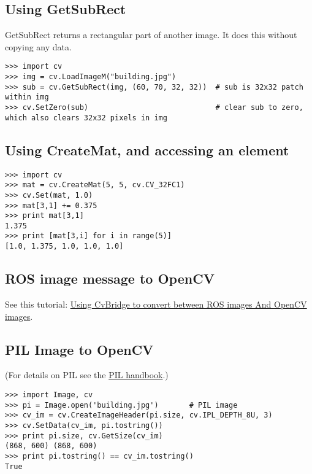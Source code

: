 \subsection{Using GetSubRect}

GetSubRect returns a rectangular part of another image.  It does this without copying any data.

\begin{lstlisting}
>>> import cv
>>> img = cv.LoadImageM("building.jpg")
>>> sub = cv.GetSubRect(img, (60, 70, 32, 32))  # sub is 32x32 patch within img
>>> cv.SetZero(sub)                             # clear sub to zero, which also clears 32x32 pixels in img
\end{lstlisting}

\subsection{Using CreateMat, and accessing an element}

\begin{lstlisting}
>>> import cv
>>> mat = cv.CreateMat(5, 5, cv.CV_32FC1)
>>> cv.Set(mat, 1.0)
>>> mat[3,1] += 0.375
>>> print mat[3,1]
1.375
>>> print [mat[3,i] for i in range(5)]
[1.0, 1.375, 1.0, 1.0, 1.0]
\end{lstlisting}

\subsection{ROS image message to OpenCV}

See this tutorial: \href{http://www.ros.org/wiki/cv\_bridge/Tutorials/UsingCvBridgeToConvertBetweenROSImagesAndOpenCVImages}{Using CvBridge to convert between ROS images And OpenCV images}.

\subsection{PIL Image to OpenCV}

(For details on PIL see the \href{http://www.pythonware.com/library/pil/handbook/image.htm}{PIL handbook}.)

\begin{lstlisting}
>>> import Image, cv
>>> pi = Image.open('building.jpg')       # PIL image
>>> cv_im = cv.CreateImageHeader(pi.size, cv.IPL_DEPTH_8U, 3)
>>> cv.SetData(cv_im, pi.tostring())
>>> print pi.size, cv.GetSize(cv_im)
(868, 600) (868, 600)
>>> print pi.tostring() == cv_im.tostring()
True
\end{lstlisting}

